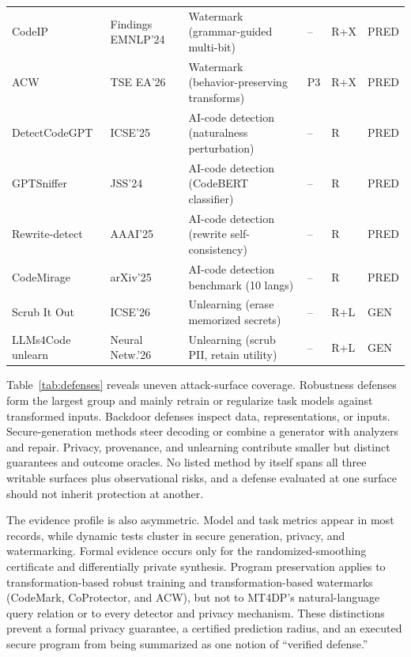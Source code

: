 \documentclass[acmsmall,screen,review]{acmart}
\begin{document}
{\begin{longtable}{@{}L{2.50cm} L{1.60cm} L{5.15cm} C{0.70cm} L{1.05cm} C{0.75cm}@{}}
CodeIP~\cite{guan2024codeip} & Findings EMNLP'24 & Watermark (grammar-guided multi-bit) & -- & R+X & \textsf{PRED} \\
ACW~\cite{li2024acw} & TSE EA'26 & Watermark (behavior-preserving transforms) & P3 & R+X & \textsf{PRED} \\
Detect\allowbreak{}CodeGPT \cite{shi2025betweenlines} & ICSE'25 & AI-code detection (naturalness perturbation) & -- & R & \textsf{PRED} \\
GPTSniffer~\cite{nguyen2024gptsniffer} & JSS'24 & AI-code detection (CodeBERT classifier) & -- & R & \textsf{PRED} \\
Rewrite-detect~\cite{ye2025uncovering} & AAAI'25 & AI-code detection (rewrite self-consistency) & -- & R & \textsf{PRED} \\
CodeMirage~\cite{guo2025codemirage} & arXiv'25 & AI-code detection benchmark (10 langs) & -- & R & \textsf{PRED} \\
Scrub It Out~\cite{chu2026scrubitout} & ICSE'26 & Unlearning (erase memorized secrets) & -- & R+L & \textsf{GEN} \\
LLMs4Code unlearn~\cite{gu2026unlearning} & Neural Netw.'26 & Unlearning (scrub PII, retain utility) & -- & R+L & \textsf{GEN} \\
\end{longtable}
}

Table~\ref{tab:defenses} reveals uneven attack-surface coverage. Robustness defenses form the largest group and mainly retrain or regularize task models against transformed inputs. Backdoor defenses inspect data, representations, or inputs. Secure-generation methods steer decoding or combine a generator with analyzers and repair. Privacy, provenance, and unlearning contribute smaller but distinct guarantees and outcome oracles. No listed method by itself spans all three writable surfaces plus observational risks, and a defense evaluated at one surface should not inherit protection at another.

The evidence profile is also asymmetric. Model and task metrics appear in most records, while dynamic tests cluster in secure generation, privacy, and watermarking. Formal evidence occurs only for the randomized-smoothing certificate and differentially private synthesis. Program preservation applies to transformation-based robust training and transformation-based watermarks (CodeMark, CoProtector, and ACW), but not to MT4DP's natural-language query relation or to every detector and privacy mechanism. These distinctions prevent a formal privacy guarantee, a certified prediction radius, and an executed secure program from being summarized as one notion of ``verified defense.''
\end{document}
